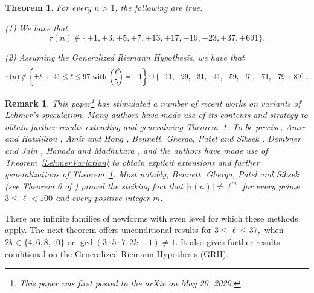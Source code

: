 \documentclass[12pt]{amsart}
\newtheorem*{remark}{Remark}
\newtheorem{thm}{Theorem}[section]
\newcommand{\?}{\color{red}?}
\newcommand{\leg}[2]{\genfrac{(}{)}{}{}{#1}{#2}}
\numberwithin{equation}{section}
\begin{document}
\begin{thm}\label{Lehmer135}
For every $n>1$, the following are true. 

\noindent
(1) We have that
$$\tau(n)\not \in \{\pm 1, \pm 3, \pm 5, \pm 7, \pm 13, \pm 17, -19, \pm 23,  \pm 37, \pm 691\}.$$

\noindent
(2)  Assuming the Generalized Riemann Hypothesis, we have that
 $$\tau(n)\not \in 
\left \{ \pm  \ell\ : \ 41\leq  \ell\leq 97  \  {\text {\rm with}}\ \leg{\ell}{5}=-1\right\} \cup
\left \{ -11, -29, -31, -41, -59, -61, -71, -79, -89\right\}.
 $$
\end{thm}

\begin{remark}
This paper\footnote{This paper was first posted to the arXiv on May 20, 2020.}  has stimulated a number of recent works
on variants of Lehmer's speculation.  Many authors have made use of
its contents and strategy to obtain further results extending and generalizing Theorem~\ref{Lehmer135}.
To be precise, Amir and Hatziiliou \cite{AmirHatziiliou}, Amir and Hong \cite{AmirHong}, 
Bennett, Gherga, Patel and Siksek \cite{BGPS}, Dembner and Jain
\cite{DembnerJain}, Hanada and Madhukara \cite{HanadaMadhukara}, and the authors \cite{PaperJNT, PaperLaMatematica} have made use of
Theorem~\ref{LehmerVariation} to obtain explicit extensions and further generalizations of Theorem~\ref{Lehmer135}.
Most notably, Bennett, Gherga, Patel and Siksek (see Theorem 6 of \cite{BGPS}) proved the striking fact  that
$|\tau(n)|\neq \ell^m$ for every prime $3\leq \ell<100$ and every positive integer $m$.
\end{remark}

\noindent
There are infinite families of newforms with even level for which these methods apply. The next theorem
offers unconditional results for $3\leq \ell \leq 37,$ when $2k \in \{4, 6, 8, 10\}$ or
 $\gcd(3 \cdot 5\cdot 7, 2k-1)\neq 1$. It also
gives further  results conditional on the Generalized Riemann Hypothesis (GRH).
\end{document}
